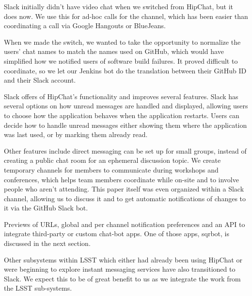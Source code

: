 Slack initially didn't have video chat when we switched from HipChat, but
it does now.  We use this for ad-hoc calls for the channel, which has been
easier than coordinating a call via Google Hangouts or BlueJeans.

When we made the switch, we wanted to take the opportunity to normalize the
users' chat names to match the names used on GitHub, which would have
simplified how we notified users of software build failures.  It proved
difficult to coordinate, so we let our Jenkins bot do the translation between
their GitHub ID and their Slack account.

Slack offers of HipChat's functionality and improves several features. Slack
has several options on how unread messages are handled and displayed, allowing
users to choose how the application behaves when the application restarts.
Users can decide how to handle unread messages either showing them where the
application was last used, or by marking them already read.

Other features include direct messaging can be set up for small groups,
instead of creating a public chat room for an ephemeral discussion topic.
We create temporary channels for members to communicate during workshops and
conferences, which helps team members coordinate while on-site and to involve
people who aren't attending.  This paper itself was even organized
within a Slack channel, allowing us to discuss it and to get automatic
notifications of changes to it via the GitHub Slack bot.

Previews of URLs, global and per channel notification preferences and an
API to integrate third-party or custom chat-bot apps. One of those apps,
sqrbot, is discussed in the next section.

Other subsystems within LSST which either had already been using HipChat or
were beginning to explore instant messaging services have also transitioned to
Slack. We expect this to be of great benefit to us as we integrate the work
from the LSST sub-systems.


